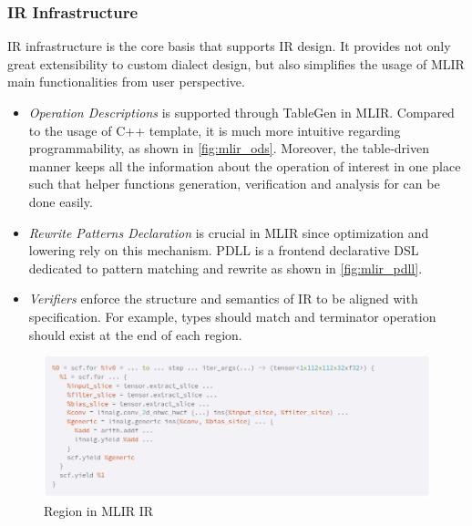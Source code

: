 \subsubsection{IR Infrastructure}

\ac{IR} infrastructure is the core basis that supports \ac{IR} design. It provides not only great extensibility to custom dialect design, but also simplifies the usage of MLIR main functionalities from user perspective.

\begin{itemize}
    \item \textit{Operation Descriptions} is supported through TableGen in MLIR. Compared to the usage of C++ template, it is much more intuitive regarding programmability, as shown in \cref{fig:mlir_ods}. Moreover, the table-driven manner keeps all the information about the operation of interest in one place such that helper functions generation, verification and analysis for can be done easily.
    
    \item \textit{Rewrite Patterns Declaration} is crucial in MLIR since optimization and lowering rely on this mechanism. \ac{PDLL} is a frontend declarative DSL dedicated to pattern matching and rewrite as shown in \cref{fig:mlir_pdll}.
    
    \item \textit{Verifiers} enforce the structure and semantics of IR to be aligned with specification. For example, types should match and terminator operation should exist at the end of each region.
\end{itemize}


\begin{figure}[ht]
    \centering
    \includegraphics[width=1.\linewidth]{figures/MLIR_IR_region.png}
    \caption{Region in MLIR IR}
    \label{fig:mlir_ir_region}
\end{figure}

